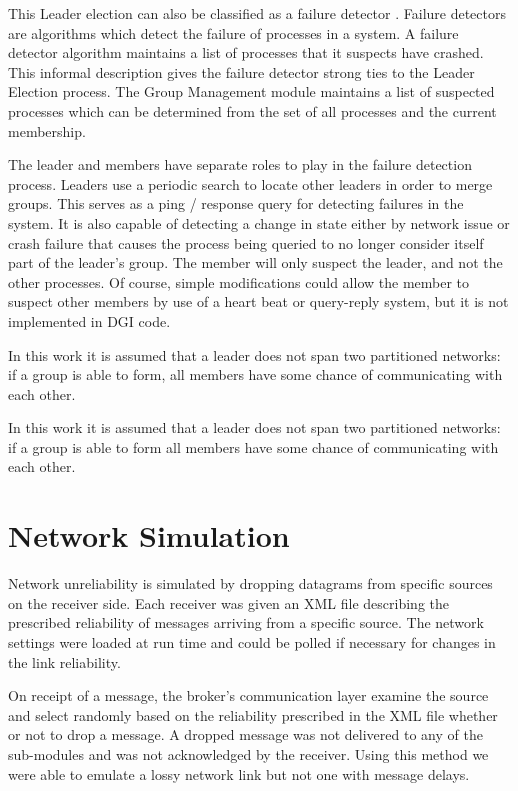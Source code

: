 This Leader election can also be classified as a failure detector 
\cite{LEADERELECTIONEVAL}. Failure detectors are algorithms which detect the failure of processes in a 
system. A failure detector algorithm maintains a list of processes that it suspects have
crashed. This informal description gives the failure detector strong ties to the
Leader Election process. The Group Management module maintains a list of 
suspected processes which can be determined from the set of all processes and the current
membership. 


The leader and members have separate roles to play in the failure detection
process. Leaders use a periodic search to locate other leaders in order to merge groups.
 This serves as a ping / response query for
detecting failures in the system. It is also capable of detecting a change in state either
by network issue or crash failure that causes the process being queried to no
longer consider itself part of the leader's group. The member will only suspect the leader, and not the other processes.
Of course, simple modifications could allow the member to suspect other members
by use of a heart beat or query-reply system, but it is not implemented in DGI code.

In this work it is assumed that a leader does not span two partitioned networks:
if a group is able to form, all members have some chance of communicating with
each other.


In this work it is assumed that a leader does not span two partitioned networks:
if a group is able to form all members have some chance of communicating with
each other.

\section{Network Simulation}

Network unreliability is simulated by dropping datagrams from specific sources 
on the receiver side. Each receiver was given an XML file describing the 
prescribed reliability of messages arriving from a specific source. The 
network settings were loaded at run time and could be polled if necessary for 
changes in the link reliability.

On receipt of a message, the broker's communication layer examine the source 
and select randomly based on the reliability prescribed in the XML file whether 
or not to drop a message. A dropped message was not delivered to any of the 
sub-modules and was not acknowledged by the receiver. Using this method we were 
able to emulate a lossy network link but not one with message delays.


